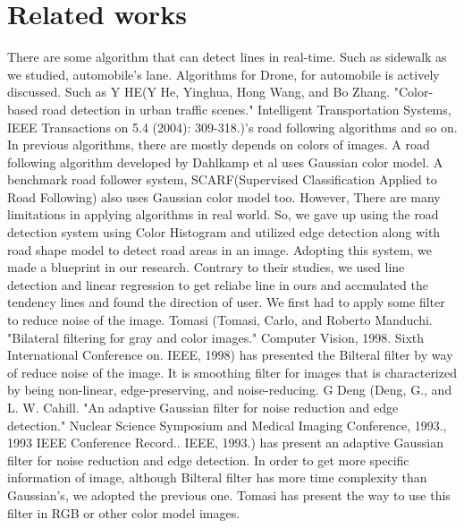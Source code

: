 \documentclass[a4class]{article}
\begin{document}
\section{Related works}
There are some algorithm that can detect lines in real-time. Such as sidewalk as we studied, automobile's lane. Algorithms for Drone, for automobile is actively discussed. Such as Y HE(Y He, Yinghua, Hong Wang, and Bo Zhang. "Color-based road detection in urban traffic scenes." Intelligent Transportation Systems, IEEE Transactions on 5.4 (2004): 309-318.)'s road following algorithms and so on. \newline
In previous algorithms, there are mostly depends on colors of images. A road following algorithm developed by Dahlkamp et al uses Gaussian color model. A benchmark road follower system, SCARF(Supervised Classification Applied to Road Following) also uses Gaussian color model too. However, There are many limitations in applying  algorithms in real world. So, we gave up using the road detection system using Color Histogram and utilized edge detection along with road shape model to detect road areas in an image. Adopting this system, we made a blueprint in our research. Contrary to their studies, we used line detection and linear regression to get reliabe line in ours and accmulated the tendency lines and found the direction of user. \newline
We first had to apply some filter to reduce noise of the image. Tomasi (Tomasi, Carlo, and Roberto Manduchi. "Bilateral filtering for gray and color images." Computer Vision, 1998. Sixth International Conference on. IEEE, 1998) has presented the Bilteral filter by way of reduce noise of the image. It is smoothing filter for images that is characterized by being non-linear, edge-preserving, and noise-reducing. G Deng (Deng, G., and L. W. Cahill. "An adaptive Gaussian filter for noise reduction and edge detection." Nuclear Science Symposium and Medical Imaging Conference, 1993., 1993 IEEE Conference Record.. IEEE, 1993.) has present an adaptive Gaussian filter for noise reduction and edge detection. In order to get more specific information of image, although Bilteral filter has more time complexity than Gaussian's, we adopted the previous one. Tomasi has present the way to use this filter in RGB or other color model images.\newline
\end{document}
